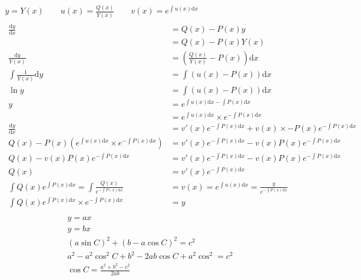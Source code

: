 \documentclass{article}
\newcommand\di[1]{\text{d}#1}
\begin{document}
  \begin{gather*}
    y = Y(x) \qquad u(x) = \frac{Q(x)}{Y(x)} \qquad v(x) = e^{\int u(x)\di{x}}\\
    \begin{aligned}
      \frac{\di{y}}{\di{x}} &= Q(x) - P(x)y \\
      &= Q(x) - P(x)Y(x) \\
      \frac{\di{y}}{Y(x)} &=  \left( \frac{Q(x)}{Y(x)} - P(x) \right)\di{x} \\
      \int\frac{1}{Y(x)}\di{y} &= \int\left(u(x) - P(x)\right)\di{x} \\
      \ln{y} &= \int\left(u(x) - P(x)\right)\di{x}\\
      y &= e^{\int u(x)\di{x} -\int P(x)\di{x}} \\
      &= e^{\int u(x)\di{x}} \times e^{-\int P(x)\di{x}} \\
      \frac{\di{y}}{\di{x}} &= v'(x)e^{-\int P(x)\di{x}} + v(x) \times -P(x)e^{-\int P(x)\di{x}} \\
      Q(x) - P(x)\left( e^{\int u(x)\di{x}} \times e^{-\int P(x)\di{x}} \right) &= v'(x)e^{-\int P(x)\di{x}} - v(x)P(x)e^{-\int P(x)\di{x}} \\
      Q(x) - v(x)P(x)e^{-\int P(x)\di{x}} &= v'(x)e^{-\int P(x)\di{x}} - v(x)P(x)e^{-\int P(x)\di{x}} \\
      Q(x) &= v'(x)e^{-\int P(x)\di{x}} \\
      \int Q(x)e^{\int P(x)\di{x}} = \int \frac{Q(x)}{e^{-\int P(x)\di{x}}} &= v(x) = e^{\int u(x)\di{x}} = \frac{y}{e^{-\int P(x)\di{x}}}  \\
      \int Q(x)e^{\int P(x)\di{x}} \times e^{-\int P(x)\di{x}} &= y 
    \end{aligned} \\
  \end{gather*}
  \begin{gather*}
    y = ax \\
    y = bx \\
    (a\sin{C})^2 + (b-a\cos{C})^2 = c^2 \\
    a^2 - a^2\cos^2{C} + b^2 - 2ab\cos{C} + a^2\cos^2 = c^2 \\
    \cos{C} = \frac{a^2 + b^2 - c^2}{2ab}
  \end{gather*}
\end{document}
